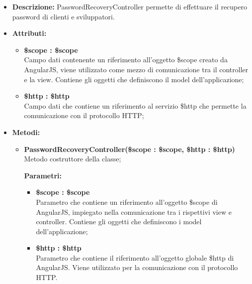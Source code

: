 \begin{itemize}
	\item \textbf{Descrizione:} PasswordRecoveryController permette di effettuare il recupero password di clienti e sviluppatori.
	\item \textbf{Attributi:}
	\begin{itemize}
		
		\item \textbf{\$scope : \$scope}\\
		Campo dati contenente un riferimento all'oggetto \$scope creato da AngularJS, viene utilizzato come mezzo di comunicazione tra il controller e la view. Contiene gli oggetti che definiscono il model dell'applicazione;
		
		\item \textbf{\$http : \$http }\\
		Campo dati che contiene un riferimento al servizio \$http che permette la comunicazione con il protocollo HTTP;
		
	\end{itemize}
	\item \textbf{Metodi:}
	\begin{itemize}
		
		\item \textbf{PasswordRecoveryController(\$scope : \$scope, \$http : \$http)}\\
		Metodo costruttore della classe;
		\begin{description}
			\item[\textbf{Parametri:}]
		\end{description}
		\begin{itemize}
			\item \textbf{\$scope : \$scope}\\
			Parametro che contiene un riferimento all'oggetto \$scope di AngularJS, impiegato nella comunicazione tra i rispettivi view e controller. Contiene gli oggetti che definiscono i model dell'applicazione;
			
			\item \textbf{\$http : \$http}\\
			Parametro che contiene il riferimento all'oggetto globale \$http di AngularJS. Viene utilizzato per la comunicazione con il protocollo HTTP.
			
		\end{itemize}	
		

\end{itemize}
\end{itemize}
